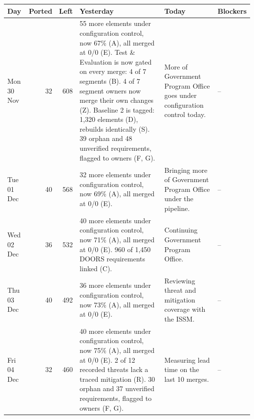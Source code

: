 \documentclass[12pt,letterpaper,oneside]{article}
\newcommand{\figfont}{\fontsize{9}{11}\selectfont}   %
\begin{document}
\begin{center}
\end{center}
{\figfont\setlength{\tabcolsep}{4pt}\renewcommand{\arraystretch}{1.15}
\begin{longtable}{@{}>{\raggedright}p{} r r >{\raggedright}p{} >{\raggedright}p{} >{\raggedright\arraybackslash}p{}@{}}
\toprule
Day & Ported & Left & Yesterday & Today & Blockers \\
\midrule
\endhead
\bottomrule
\endfoot
Mon 30 Nov & 32 & 608 & 55 more elements under configuration control, now 67\% (A), all merged at 0/0 (E). Test \& Evaluation is now gated on every merge: 4 of 7 segments (B). 4 of 7 segment owners now merge their own changes (Z). Baseline 2 is tagged: 1,320 elements (D), rebuilds identically (S). 39 orphan and 48 unverified requirements, flagged to owners (F, G). & More of Government Program Office goes under configuration control today. & -- \\
Tue 01 Dec & 40 & 568 & 32 more elements under configuration control, now 69\% (A), all merged at 0/0 (E). & Bringing more of Government Program Office under the pipeline. & -- \\
Wed 02 Dec & 36 & 532 & 40 more elements under configuration control, now 71\% (A), all merged at 0/0 (E). 960 of 1,450 DOORS requirements linked (C). & Continuing Government Program Office. & -- \\
Thu 03 Dec & 40 & 492 & 36 more elements under configuration control, now 73\% (A), all merged at 0/0 (E). & Reviewing threat and mitigation coverage with the ISSM. & -- \\
Fri 04 Dec & 32 & 460 & 40 more elements under configuration control, now 75\% (A), all merged at 0/0 (E). 2 of 12 recorded threats lack a traced mitigation (R). 30 orphan and 37 unverified requirements, flagged to owners (F, G). & Measuring lead time on the last 10 merges. & -- \\

\end{longtable}}
\end{document}
